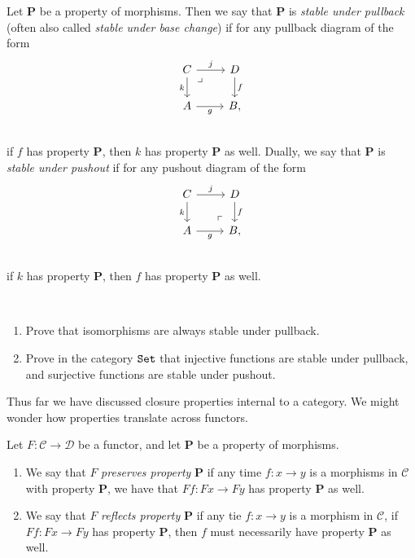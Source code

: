 \documentclass{article}[11pt]
\begin{document}
\begin{definition} Let \textbf{P} be a property of morphisms. Then we say that \textbf{P} is \textit{stable under pullback} (often also called \textit{stable under base change}) if for any pullback diagram of the form
\[ \begin{tikzcd}
    C\rar["j" above]\dar["k" left]\pb & D\dar["f" right]\\
    A\rar["g" below] & B,\\
\end{tikzcd} \]
if $f$ has property \textbf{P}, then $k$ has property \textbf{P} as well. Dually, we say that \textbf{P} is \textit{stable under pushout} if for any pushout diagram of the form
\[ \begin{tikzcd}
    C\rar["j" above]\dar["k" left] & D\dar["f" right]\\
    A\rar["g" below] & B\po,\\
\end{tikzcd} \]
if $k$ has property \textbf{P}, then $f$ has property \textbf{P} as well.
\end{definition}

\begin{exercise}\label{exer:injective-stable-under-pullback} $\ $
\begin{enumerate}
    \item Prove that isomorphisms are always stable under pullback.
    \item Prove in the category $\texttt{Set}$ that injective functions are stable under pullback, and surjective functions are stable under pushout.
\end{enumerate}
\end{exercise}


Thus far we have discussed closure properties internal to a category. We might wonder how properties translate across functors.

\begin{definition}\label{def:labelname} Let $F: \mathscr{C} \to \mathscr{D}$ be a functor, and let \textbf{P} be a property of morphisms.
\begin{enumerate}
    \item We say that $F$ \textit{preserves property} \textbf{P} if any time $f: x \to y$ is a morphisms in $\mathscr{C}$ with property \textbf{P}, we have that $Ff: Fx \to Fy$ has property \textbf{P} as well.

    \item We say that $F$ \textit{reflects property} \textbf{P} if any tie $f:x \to y$ is a morphism in $\mathscr{C}$, if $Ff: Fx \to Fy$ has property \textbf{P}, then $f$ must necessarily have property \textbf{P} as well.
\end{enumerate}
\end{definition}
\end{document}
